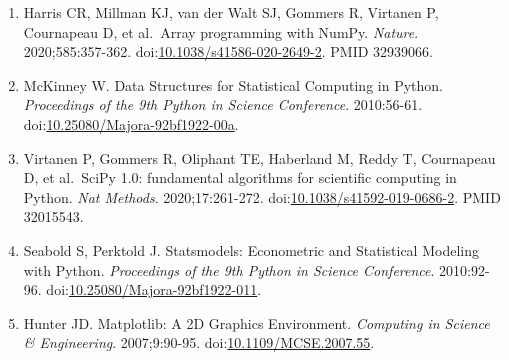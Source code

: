 \documentclass[11pt]{article}
\begin{document}
\begin{enumerate}
\item
  Harris CR, Millman KJ, van der Walt SJ, Gommers R, Virtanen P,
  Cournapeau D, et al.~Array programming with NumPy. \emph{Nature}.
  2020;585:357-362.
  doi:\href{https://doi.org/10.1038/s41586-020-2649-2}{10.1038/s41586-020-2649-2}.
  PMID 32939066.
\item
  McKinney W. Data Structures for Statistical Computing in Python.
  \emph{Proceedings of the 9th Python in Science Conference}.
  2010:56-61.
  doi:\href{https://doi.org/10.25080/Majora-92bf1922-00a}{10.25080/Majora-92bf1922-00a}.
\item
  Virtanen P, Gommers R, Oliphant TE, Haberland M, Reddy T, Cournapeau
  D, et al.~SciPy 1.0: fundamental algorithms for scientific computing
  in Python. \emph{Nat Methods}. 2020;17:261-272.
  doi:\href{https://doi.org/10.1038/s41592-019-0686-2}{10.1038/s41592-019-0686-2}.
  PMID 32015543.
\item
  Seabold S, Perktold J. Statsmodels: Econometric and Statistical
  Modeling with Python. \emph{Proceedings of the 9th Python in Science
  Conference}. 2010:92-96.
  doi:\href{https://doi.org/10.25080/Majora-92bf1922-011}{10.25080/Majora-92bf1922-011}.
\item
  Hunter JD. Matplotlib: A 2D Graphics Environment. \emph{Computing in
  Science \& Engineering}. 2007;9:90-95.
  doi:\href{https://doi.org/10.1109/MCSE.2007.55}{10.1109/MCSE.2007.55}.
\end{enumerate}
\end{document}
